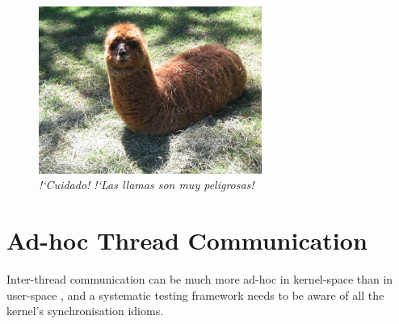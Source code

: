 \begin{figure}[t]
	\begin{center}
	\includegraphics[width=0.65\textwidth]{vip1066720.jpg}
	\end{center}
	\caption{{\em !`Cuidado! !`Las llamas son muy peligrosas!}~\cite{de0u}}
\end{figure}

\section{Ad-hoc Thread Communication}

Inter-thread communication can be much more ad-hoc in kernel-space than in user-space \cite{datacollider}, and a systematic testing framework needs to be aware of all the kernel's synchronisation idioms.

